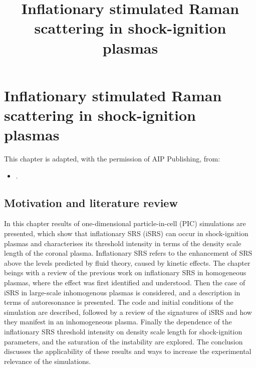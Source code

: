 
\chapter{Inflationary stimulated Raman scattering in shock-ignition plasmas}
\label{chp:iSRS}
%

\title{Inflationary stimulated Raman scattering in shock-ignition plasmas}

This chapter is adapted, with the permission of AIP Publishing, from:
\begin{itemize}
  \item {}.
\end{itemize}

\section{Motivation and literature review}
In this chapter results of one-dimensional particle-in-cell (PIC) simulations are presented, which show that inflationary SRS (iSRS) can occur in shock-ignition plasmas and characterises its threshold intensity in terms of the density scale length of the coronal plasma. Inflationary SRS refers to the enhancement of SRS above the levels predicted by fluid theory, caused by kinetic effects. The chapter beings with a review of the previous work on inflationary SRS in homogeneous plasmas, where the effect was first identified and understood. Then the case of iSRS in large-scale inhomogenous plasmas is considered, and a description in terms of autoresonance is presented. The code and initial conditions of the simulation are described, followed by a review of the signatures of iSRS and how they manifest in an inhomogeneous plasma. Finally the dependence of the inflationary SRS threshold intensity on density scale length for shock-ignition parameters, and the saturation of the instability are explored. The conclusion discusses the applicability of these results and ways to increase the experimental relevance of the simulations.


